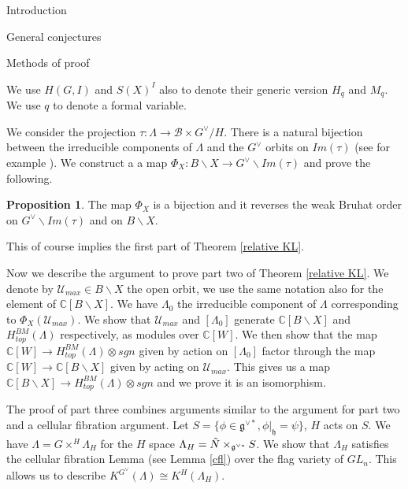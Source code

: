 \documentclass[12pt]{article}
\newcommand{\B}{\mathcal{B}}
\newcommand{\C}{\mathbb{C}}
\newcommand{\<}{\langle}
\renewcommand{\>}{\rangle}
\theoremstyle{plain}
\theoremstyle{definition}
\newtheorem{prop}[theorem]{Proposition}
\begin{document}
\begin{section}{Introduction}
\begin{subsection}{General conjectures}
    
\end{subsection}


\begin{subsection}{Methods of proof}

We use $H(G,I)$ and $S(X)^I$ also to denote their generic version $H_q$ and $M_q$. We use $q$ to denote a formal variable.

We consider the projection $\tau:\Lambda\rightarrow \B\times G^\vee/H$. There is a natural bijection between the irreducible components of $\Lambda$ and the $G^\vee$ orbits on $Im(\tau)$ (see for example \cite{kononenko2024lagrangiansubvarietieshypersphericalvarieties}). We construct a a map $\Phi_X:B\backslash X\rightarrow G^\vee\backslash Im(\tau)$ and prove the following.

\begin{prop}
    The map $\Phi_X$ is a bijection and it reverses the weak Bruhat order on $G^\vee\backslash Im(\tau)$ and on $B\backslash X$. 
\end{prop}

This of course implies the first part of Theorem \ref{relative KL}.

 Now we describe the argument to prove part two of Theorem \ref{relative KL}. We denote by $\mathcal{U}_{max}\in B\backslash X$ the open orbit, we use the same notation also for the element of $\C[B\backslash X]$. We have $\Lambda_0$ the irreducible component of $\Lambda$ corresponding to $\Phi_X(\mathcal{U}_{max})$. We show that $\mathcal{U}_{max}$ and $[\Lambda_0]$ generate $\C[B\backslash X]$ and $H_{top}^{BM}(\Lambda)$ respectively, as modules over $\C[W]$. We then show that the map $\C[W]\rightarrow H_{top}^{BM}(\Lambda)\otimes sgn$ given by action on $[\Lambda_0]$ factor through the map $\C[W]\rightarrow\C[B\backslash X]$ given by acting on $\mathcal{U}_{max}$. This gives us a map $\C[B\backslash X]\rightarrow H_{top}^{BM}(\Lambda)\otimes sgn$ and we prove it is an isomorphism.

 The proof of part three combines arguments similar to the argument for part two and a cellular fibration argument.  Let $S=\{\phi\in \mathfrak{g}^{\vee*},\phi|_\mathfrak{h}=\psi\}$, $H$ acts on $S$. We have $\Lambda=G\times^H\Lambda_H$ for the $H$ space $\Lambda_H=\Tilde{N}\times_{\mathfrak{g}^{\vee*}}S$. We show that $\Lambda_H$ satisfies the cellular fibration Lemma (see Lemma \ref{cfl}) over the flag variety of $GL_n$. This allows us to describe $K^{G^\vee}(\Lambda)\cong K^H(\Lambda_H)$.


\end{subsection}
\end{section}
\end{document}
